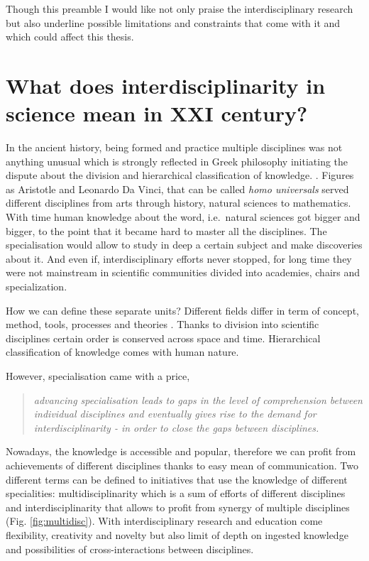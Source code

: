 \documentclass[12pt,]{book}
\theoremstyle{definition}
\theoremstyle{definition}
\theoremstyle{definition}
\theoremstyle{remark}
\begin{document}
Though this preamble I would like not only praise the interdisciplinary
research but also underline possible limitations and constraints that
come with it and which could affect this thesis.

\hypertarget{what-does-interdisciplinarity-in-science-mean-in-xxi-century}{%
\section*{What does interdisciplinarity in science mean in XXI
century?}\label{what-does-interdisciplinarity-in-science-mean-in-xxi-century}}

In the ancient history, being formed and practice multiple disciplines
was not anything unusual which is strongly reflected in Greek philosophy
initiating the dispute about the division and hierarchical
classification of knowledge. \citep{Slavicek2012}. Figures as Aristotle
and Leonardo Da Vinci, that can be called \emph{homo universals} served
different disciplines from arts through history, natural sciences to
mathematics. With time human knowledge about the word, i.e.~natural
sciences got bigger and bigger, to the point that it became hard to
master all the disciplines. The specialisation would allow to study in
deep a certain subject and make discoveries about it. And even if,
interdisciplinary efforts never stopped, for long time they were not
mainstream in scientific communities divided into academies, chairs and
specialization.

How we can define these separate units? Different fields differ in term
of concept, method, tools, processes and theories \citep{Slavicek2012}.
Thanks to division into scientific disciplines certain order is
conserved across space and time. Hierarchical classification of
knowledge comes with human nature.

However, specialisation came with a price,

\begin{quote}
\emph{advancing specialisation leads to gaps in the level of
comprehension between individual disciplines and eventually gives rise
to the demand for interdisciplinarity - in order to close the gaps
between disciplines.}\citep{Slavicek2012}
\end{quote}

Nowadays, the knowledge is accessible and popular, therefore we can
profit from achievements of different disciplines thanks to easy mean of
communication. Two different terms can be defined to initiatives that
use the knowledge of different specialities: multidisciplinarity which
is a sum of efforts of different disciplines and interdisciplinarity
that allows to profit from synergy of multiple disciplines (Fig.
\ref{fig:multidisc}). With interdisciplinary research and education come
flexibility, creativity and novelty but also limit of depth on ingested
knowledge and possibilities of cross-interactions between disciplines.
\end{document}
